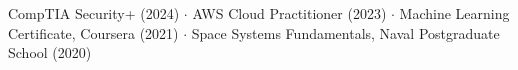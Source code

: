 \noindent CompTIA Security+ (2024) $\cdot$ AWS Cloud Practitioner (2023) $\cdot$
Machine Learning Certificate, Coursera (2021) $\cdot$
Space Systems Fundamentals, Naval Postgraduate School (2020)
